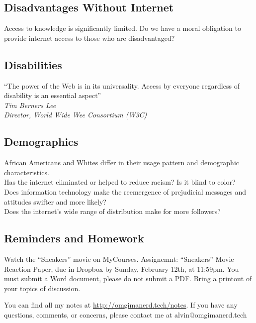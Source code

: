 \documentclass{article}
\begin{document}
\subsection*{Disadvantages Without Internet}
Access to knowledge is significantly limited.
Do we have a moral obligation to provide internet access to those who are
disadvantaged?

\subsection*{Disabilities}
``The power of the Web is in its universality. Access by everyone regardless of
disability is an essential aspect'' \\
\textit{Tim Berners Lee} \\
\textit{Director, World Wide Wee Consortium (W3C)}

\subsection*{Demographics}
African Americans and Whites differ in their usage pattern and demographic
characteristics. \\
Has the internet eliminated or helped to reduce racism? Is it blind to color? \\
Does information technology make the reemergence of prejudicial messages and
attitudes swifter and more likely? \\
Does the internet's wide range of distribution make for more followers?

\subsection*{Reminders and Homework}
Watch the ``Sneakers'' movie on MyCourses.
Assignemnt: ``Sneakers'' Movie Reaction Paper, due in Dropbox by Sunday,
February 12th, at 11:59pm. You must submit a Word document, please do not
submit a PDF.
Bring a printout of your topics of discussion.

\begin{center}
  You can find all my notes at \url{http://omgimanerd.tech/notes}. If you have
  any questions, comments, or concerns, please contact me at
  alvin@omgimanerd.tech
\end{center}
\end{document}
